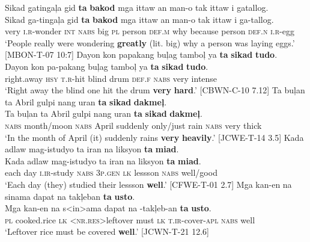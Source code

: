 \ea
\label{bkm:Ref52476459}
Sikad  gatingaļa  gid  \textbf{ta}  \textbf{bakod}  mga  ittaw  an  man-o  tak ittaw  i  gatallog. \\\smallskip
 \gll Sikad  ga-tingaļa  gid  \textbf{ta}  \textbf{bakod}  mga  ittaw  an  man-o  tak ittaw  i  ga-tallog. \\
very  \textsc{i.r}-wonder  \textsc{int}  \textsc{nabs}  big  \textsc{pl}  person  \textsc{def.m}  why  because person  \textsc{def.n}  \textsc{i.r}-egg \\
\glt ‘People really were wondering \textbf{greatly} (lit. big) why a person was laying eggs.’ [MBON-T-07 10:7]
\z
\ea
Dayon  kon  papakang  buļag  tamboļ  ya  \textbf{ta}  \textbf{sikad}  \textbf{tudo}. \\\smallskip
 \gll Dayon  kon  pa-pakang  buļag  tamboļ  ya  \textbf{ta}  \textbf{sikad}  \textbf{tudo}. \\
right.away  \textsc{hsy}  \textsc{t.r}-hit  blind  drum  \textsc{def.f}  \textsc{nabs} very  intense \\
\glt ‘Right away the blind one hit the drum \textbf{very} \textbf{hard}.’ [CBWN-C-10 7.12]
\z
\ea
Ta  buļan  ta  Abril  gulpi  nang  uran  \textbf{ta}  \textbf{sikad}  \textbf{dakmeļ}. \\\smallskip
 \gll Ta  buļan  ta  Abril  gulpi  nang  uran  \textbf{ta}  \textbf{sikad}  \textbf{dakmeļ}. \\
\textsc{nabs} month/moon  \textsc{nabs} April  suddenly  only/just  rain  \textsc{nabs} very  thick \\
\glt ‘In the month of April (it) suddenly rains \textbf{very} \textbf{heavily}.’ [JCWE-T-14 3.5]
\z
\ea
Kada  adlaw  mag-istudyo  ta  iran  na  liksyon  \textbf{ta}  \textbf{miad}. \\\smallskip
 \gll Kada  adlaw  mag-istudyo  ta  iran  na  liksyon  \textbf{ta}  \textbf{miad}. \\
each  day  \textsc{i.ir}-study  \textsc{nabs}  3\textsc{p.gen}  \textsc{lk}  lessson  \textsc{nabs}  well/good \\
\glt ‘Each day (they) studied their lessson \textbf{well}.’ [CFWE-T-01 2.7]
\z
\ea
Mga  kan-en  na  sinama  dapat  na  takļeban  \textbf{ta}  \textbf{usto}. \\\smallskip
 \gll Mga  kan-en  na  s<in>ama  dapat  na  \emptyset{}-takļeb-an  \textbf{ta}  \textbf{usto}. \\
\textsc{pl}  cooked.rice  \textsc{lk}  <\textsc{nr.res}>leftover  must  \textsc{lk}  \textsc{t.ir}-cover-\textsc{apl}  \textsc{nabs} well \\
\glt ‘Leftover rice must be covered \textbf{well}.’ [JCWN-T-21 12.6]
\z

